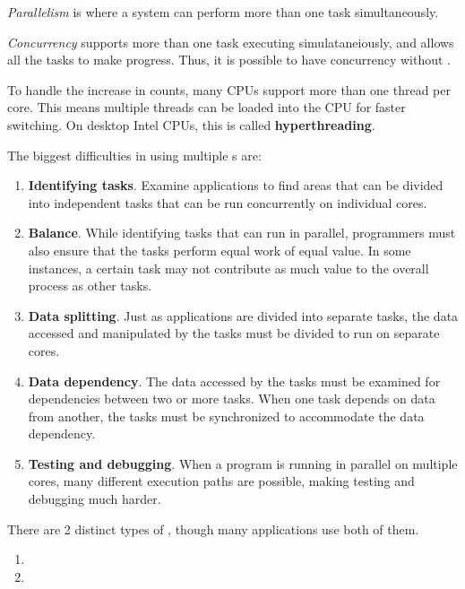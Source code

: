\begin{definition}[Parallelism]\label{def:Parallelism}
  \emph{Parallelism} is where a system can perform more than one task simultaneously.
\end{definition}

\begin{definition}[Concurrency]\label{def:Concurrency}
  \emph{Concurrency} supports more than one task executing simulataneiously, and allows all the tasks to make progress.
  Thus, it is possible to have concurrency without .
\end{definition}

To handle the increase in   counts, many CPUs support more than one thread per core.
This means multiple threads can be loaded into the CPU for faster switching.
On desktop Intel CPUs, this is called \textbf{hyperthreading}.

The biggest difficulties in using multiple s are:
\begin{enumerate}[noitemsep]
\item \textbf{Identifying tasks}.
  Examine applications to find areas that can be divided into independent tasks that can be run concurrently on individual cores.
\item \textbf{Balance}.
  While identifying tasks that can run in parallel, programmers must also ensure that the tasks perform equal work of equal value.
  In some instances, a certain task may not contribute as much value to the overall process as other tasks.
\item \textbf{Data splitting}.
  Just as applications are divided into separate tasks, the data accessed and manipulated by the tasks must be divided to run on separate cores.
\item \textbf{Data dependency}.
  The data accessed by the tasks must be examined for dependencies between two or more tasks.
  When one task depends on data from another, the tasks must be synchronized to accommodate the data dependency.
\item \textbf{Testing and debugging}.
  When a program is running in parallel on multiple cores, many different execution paths are possible, making testing and debugging much harder.
\end{enumerate}

There are 2 distinct types of , though many applications use both of them.
\begin{enumerate}[noitemsep]
\item {}
\item {}
\end{enumerate}

